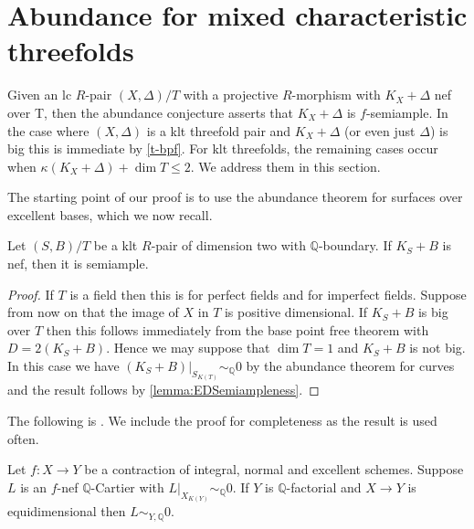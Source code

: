 \documentclass[a4paper,12pt]{book}
\begin{document}
	\section{Abundance for mixed characteristic threefolds}
	
	Given an lc $R$-pair $(X,\Delta)/T$ with a projective $R$-morphism with $K_{X}+\Delta$ nef over T, then the abundance conjecture asserts that $K_{X}+\Delta$ is $f$-semiample. 
	In the case where $(X,\Delta)$ is a klt threefold pair and $K_{X}+\Delta$ (or even just $\Delta$) is big this is immediate by \autoref{t-bpf}. For klt threefolds, the remaining cases occur when $\kappa(K_{X}+\Delta) + \dim T \leq 2$. We address them in this section.
	
	The starting point of our proof is to use the abundance theorem for surfaces over excellent bases, which we now recall. 
	
	\begin{theorem}\label{abundance-dim2}
		Let $(S,B)/T$ be a klt $R$-pair of dimension two with $\mathbb{Q}$-boundary. If $K_{S}+B$ is nef, then it is semiample.
	\end{theorem}
	
	\begin{proof}	
		If $T$ is a field then this is \cite[Theorem 1.2]{fujino2012log} for perfect fields and \cite{tanaka2020abundance} for imperfect fields. 
		Suppose from now on that the image of $X$ in $T$ is positive dimensional.
		If $K_{S}+B$ is big over $T$ then this follows immediately from the base point free theorem \cite[Theorem 4.2]{Tan18} with $D=2(K_{S}+B)$. Hence we may suppose that $\dim T=1$ and $K_{S}+B$ is not big. In this case we have $(K_{S}+B)|_{S_{K(T)}} \sim_{\mathbb{Q}} 0$ by the abundance theorem for curves and the result follows by \autoref{lemma:EDSemiampleness}. 
	\end{proof}
	
	The following is \cite[Lemma 2.17]{cascini2020relative}. We include the proof for completeness as the result is used often.
	
	
	\begin{lemma}\label{lemma:EDSemiampleness}
		Let $f\colon X \to Y$ be a contraction of integral, normal and excellent schemes. Suppose $L$ is an $f$-nef $\mathbb{Q}$-Cartier with $L|_{X_{K(Y)}} \sim_{\mathbb{Q}} 0$. If $Y$ is $\mathbb{Q}$-factorial and $X \to Y$ is equidimensional then $L \sim_{Y,\mathbb{Q}} 0$.
	\end{lemma}
	
\end{document}
